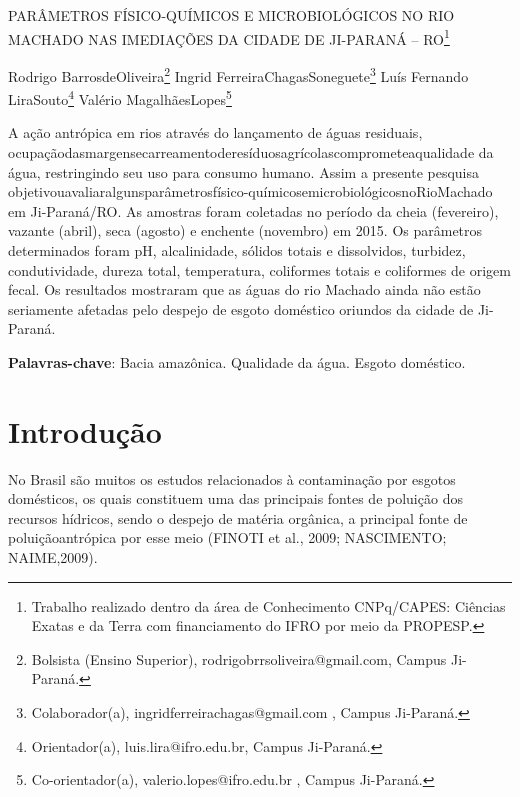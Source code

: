 \documentclass[article,12pt,onesidea,4paper,english,brazil]{abntex2}
\begin{document}
	
	
	\frenchspacing 
	
	\begin{center}
		\LARGE PARÂMETROS FÍSICO-QUÍMICOS E MICROBIOLÓGICOS NO RIO MACHADO NAS IMEDIAÇÕES DA CIDADE DE JI-PARANÁ – RO\footnote{Trabalho realizado dentro da área de Conhecimento CNPq/CAPES: Ciências Exatas e da Terra com financiamento do IFRO por meio da PROPESP.}
		
		\normalsize
		Rodrigo BarrosdeOliveira\footnote{Bolsista (Ensino Superior), rodrigobrrsoliveira@gmail.com, Campus Ji-Paraná.} 
		Ingrid FerreiraChagasSoneguete\footnote{Colaborador(a), ingridferreirachagas@gmail.com , Campus Ji-Paraná.} 
		Luís Fernando LiraSouto\footnote{Orientador(a), luis.lira@ifro.edu.br, Campus Ji-Paraná.} 
		Valério MagalhãesLopes\footnote{Co-orientador(a), valerio.lopes@ifro.edu.br , Campus Ji-Paraná.} 
	\end{center}
	
	\begin{resumoumacoluna}
		A ação antrópica em rios através do lançamento de águas residuais, ocupaçãodasmargensecarreamentoderesíduosagrícolascomprometeaqualidade da água, restringindo seu uso para consumo humano. Assim a presente pesquisa objetivouavaliaralgunsparâmetrosfísico-químicosemicrobiológicosnoRioMachado em Ji-Paraná/RO. As amostras foram coletadas no período da cheia (fevereiro), vazante (abril), seca (agosto) e enchente (novembro) em 2015. Os parâmetros determinados foram pH, alcalinidade, sólidos totais e dissolvidos, turbidez, condutividade, dureza total, temperatura, coliformes totais e coliformes de origem fecal. Os resultados mostraram que as águas do rio Machado ainda não estão seriamente afetadas pelo despejo de esgoto doméstico oriundos da cidade de Ji- Paraná.
		
		\vspace{\onelineskip}
		
		\noindent
		\textbf{Palavras-chave}: Bacia amazônica. Qualidade da água. Esgoto doméstico.
		
	\end{resumoumacoluna}
	
	\section*{Introdução}
	
No Brasil são muitos os estudos relacionados à contaminação por esgotos domésticos, os quais constituem uma das principais fontes de poluição dos recursos hídricos, sendo o despejo de matéria orgânica, a principal fonte de poluiçãoantrópica por esse meio (FINOTI et al., 2009; NASCIMENTO; NAIME,2009).
\end{document}
